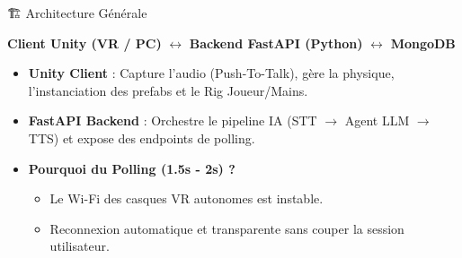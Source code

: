 \documentclass[aspectratio=169]{beamer}
\begin{document}
\begin{frame}{🏗️ Architecture Générale}
  \begin{center}
    \textbf{Client Unity (VR / PC)} $\longleftrightarrow$ \textbf{Backend FastAPI (Python)} $\longleftrightarrow$ \textbf{MongoDB}
  \end{center}

  \begin{itemize}
    \item \textbf{Unity Client} : Capture l'audio (Push-To-Talk), gère la physique, l'instanciation des prefabs et le Rig Joueur/Mains.
    \item \textbf{FastAPI Backend} : Orchestre le pipeline IA (STT $\rightarrow$ Agent LLM $\rightarrow$ TTS) et expose des endpoints de polling.
    \item \textbf{Pourquoi du Polling (1.5s - 2s) ?} 
      \begin{itemize}
        \item Le Wi-Fi des casques VR autonomes est instable.
        \item Reconnexion automatique et transparente sans couper la session utilisateur.
      \end{itemize}
  \end{itemize}

\end{frame}
\end{document}
